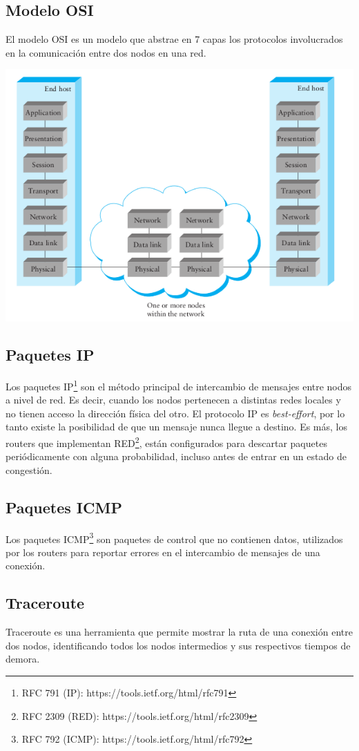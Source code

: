 \subsection{Modelo OSI}

El modelo OSI es un modelo que abstrae en 7 capas los protocolos involucrados en la comunicación entre dos nodos en una red.

\begin{center}
\includegraphics[width=\textwidth/2]{imgs/osi.png}
\end{center}

\subsection{Paquetes IP}

Los paquetes IP\footnote{RFC 791 (IP): https://tools.ietf.org/html/rfc791} son el método principal de intercambio de mensajes entre nodos a nivel de red. Es decir, cuando los nodos pertenecen a distintas redes locales y no tienen acceso la dirección física del otro. El protocolo IP es \textit{best-effort}, por lo tanto existe la posibilidad de que un mensaje nunca llegue a destino. Es más, los routers que implementan RED\footnote{RFC 2309 (RED): https://tools.ietf.org/html/rfc2309}, están configurados para descartar paquetes periódicamente con alguna probabilidad, incluso antes de entrar en un estado de congestión.

\subsection{Paquetes ICMP}

Los paquetes ICMP\footnote{RFC 792 (ICMP): https://tools.ietf.org/html/rfc792} son paquetes de control que no contienen datos, utilizados por los routers para reportar errores en el intercambio de mensajes de una conexión.

\subsection{Traceroute}

Traceroute es una herramienta que permite mostrar la ruta de una conexión entre dos nodos, identificando todos los nodos intermedios y sus respectivos tiempos de demora.
